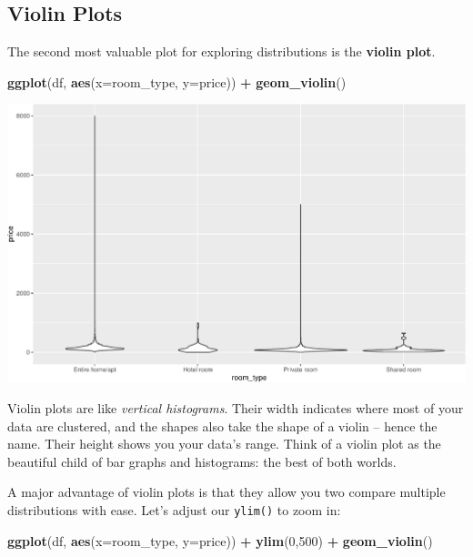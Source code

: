 \documentclass[
]{book}
\newenvironment{Shaded}{\begin{snugshade}}{\end{snugshade}}
\newcommand{\DataTypeTok}[1]{\textcolor[rgb]{0.13,0.29,0.53}{#1}}
\newcommand{\DecValTok}[1]{\textcolor[rgb]{0.00,0.00,0.81}{#1}}
\newcommand{\KeywordTok}[1]{\textcolor[rgb]{0.13,0.29,0.53}{\textbf{#1}}}
\newcommand{\NormalTok}[1]{#1}
\newcommand{\OperatorTok}[1]{\textcolor[rgb]{0.81,0.36,0.00}{\textbf{#1}}}
\newcommand{\StringTok}[1]{\textcolor[rgb]{0.31,0.60,0.02}{#1}}
\begin{document}
\hypertarget{violin-plots}{%
\subsection*{Violin Plots}\label{violin-plots}}

The second most valuable plot for exploring distributions is the \textbf{violin plot}.

\begin{Shaded}
\begin{Highlighting}[]
\KeywordTok{ggplot}\NormalTok{(df, }\KeywordTok{aes}\NormalTok{(}\DataTypeTok{x=}\NormalTok{room_type,}
               \DataTypeTok{y=}\NormalTok{price)) }\OperatorTok{+}\StringTok{ }
\StringTok{  }\KeywordTok{geom_violin}\NormalTok{()}
\end{Highlighting}
\end{Shaded}

\includegraphics{figures/unnamed-chunk-219-1.pdf}

Violin plots are like \emph{vertical histograms}. Their width indicates where most of your data are clustered, and the shapes also take the shape of a violin -- hence the name. Their height shows you your data's range. Think of a violin plot as the beautiful child of bar graphs and histograms: the best of both worlds.

A major advantage of violin plots is that they allow you two compare multiple distributions with ease. Let's adjust our \texttt{ylim()} to zoom in:

\begin{Shaded}
\begin{Highlighting}[]
\KeywordTok{ggplot}\NormalTok{(df, }
       \KeywordTok{aes}\NormalTok{(}\DataTypeTok{x=}\NormalTok{room_type,}
           \DataTypeTok{y=}\NormalTok{price)) }\OperatorTok{+}\StringTok{ }
\StringTok{  }\KeywordTok{ylim}\NormalTok{(}\DecValTok{0}\NormalTok{,}\DecValTok{500}\NormalTok{) }\OperatorTok{+}
\StringTok{  }\KeywordTok{geom_violin}\NormalTok{()}
\end{Highlighting}
\end{Shaded}
\end{document}
